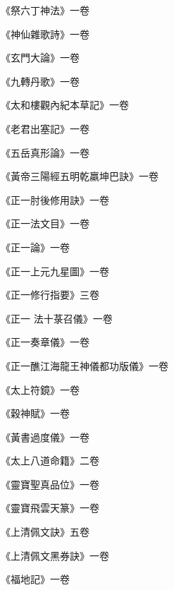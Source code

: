 \begin{pinyinscope}
 《祭六丁神法》一卷



 《神仙雜歌詩》一卷



 《玄門大論》一卷



 《九轉丹歌》一卷



 《太和樓觀內紀本草記》一卷



 《老君出塞記》一卷



 《五岳真形論》一卷



 《黃帝三陽經五明乾羸坤巴訣》一卷



 《正一肘後修用訣》一卷



 《正一法文目》一卷



 《正一論》一卷



 《正一上元九星圖》一卷



 《正一修行指要》三卷



 《正一
 法十菉召儀》一卷



 《正一奏章儀》一卷



 《正一醮江海龍王神儀都功版儀》一卷



 《太上符鏡》一卷



 《穀神賦》一卷



 《黃書過度儀》一卷



 《太上八道命籍》二卷



 《靈寶聖真品位》一卷



 《靈寶飛雲天篆》一卷



 《上清佩文訣》五卷



 《上清佩文黑券訣》一卷



 《福地記》一卷




\end{pinyinscope}
